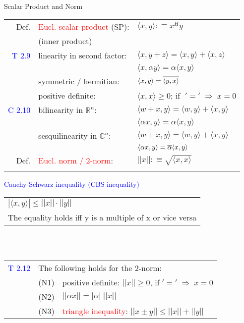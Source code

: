 \begin{mainbox}{Scalar Product and Norm}
\setlength{\tabcolsep}{2pt}
\begin{tabular}{rll}
	Def. & \textcolor{red}{Eucl. scalar product} (SP):& $\langle x,y\rangle :\equiv x^Hy$\\
	& (inner product) & \\
	\rule{0pt}{3ex}
	\textcolor{blue}{T 2.9} & linearity in second factor: & $\langle x,y+z\rangle = \langle x,y\rangle + \langle x,z\rangle$\\
	& & $\langle x,\alpha y\rangle = \alpha \langle x,y\rangle$\\
	& symmetric / hermitian: & $\langle x,y\rangle = \overline{\langle y,x \rangle}$\\
	& positive definite: & $\langle x,x\rangle \geq 0$; if $\;'='\;\Rightarrow\;x = 0$\\ 
	\rule{0pt}{3ex}
	\textcolor{blue}{C 2.10} & bilinearity in $\mathbb{R}^n$: & $\langle w+x,y\rangle = \langle w,y\rangle + \langle x,y\rangle$\\
	& & $\langle \alpha x,y\rangle = \alpha \langle x,y\rangle$\\
	& sesquilinearity in $\mathbb{C}^n$: & $\langle w+x,y\rangle = \langle w,y\rangle + \langle x,y\rangle$\\
	& & $\langle \alpha x,y\rangle = \overline{\alpha} \langle x,y\rangle$\\ 
	\rule{0pt}{3ex}
	Def. & \textcolor{red}{Eucl. norm / 2-norm}: & $||x|| :\equiv \sqrt{\langle x,x \rangle}$\\
	\rule{0pt}{3ex}
\end{tabular}
\textcolor{blue}{Cauchy-Schwarz inequality (CBS inequality)} \\
\begin{tabular}{l}
	$|\langle x,y\rangle| \leq ||x|| \cdot ||y||$\\
	The equality holds iff y is a multiple of x or vice versa\\
\end{tabular}\\
\smallskip\\
\setlength{\tabcolsep}{2pt}
\begin{tabular}{rrl}
	\textcolor{blue}{T 2.12} & \multicolumn{2}{l}{The following holds for the 2-norm:} \\
	& (N1) & positive definite: $||x|| \geq 0$, if$\;'='\;\Rightarrow\; x = 0$\\
	& (N2) & $||\alpha x|| = |\alpha |\;||x||$\\
	& (N3) & \textcolor{red}{triangle inequality}: $||x\pm y|| \leq ||x|| + ||y||$\\

\end{tabular}
\end{mainbox}

